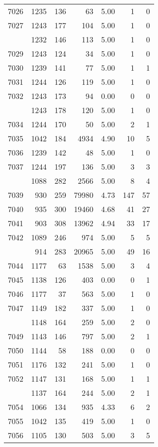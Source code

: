 \documentclass[
]{article}
\begin{document}
\begin{table}
\begin{tabular}[t]{lrrrrrr}
7026 & 1235 & 136 & 63 & 5.00 & 1 & 0\\
7027 & 1243 & 177 & 104 & 5.00 & 1 & 0\\
\addlinespace
7028 & 1232 & 146 & 113 & 5.00 & 1 & 0\\
7029 & 1243 & 124 & 34 & 5.00 & 1 & 0\\
7030 & 1239 & 141 & 77 & 5.00 & 1 & 1\\
7031 & 1244 & 126 & 119 & 5.00 & 1 & 0\\
7032 & 1243 & 173 & 94 & 0.00 & 0 & 0\\
\addlinespace
7033 & 1243 & 178 & 120 & 5.00 & 1 & 0\\
7034 & 1244 & 170 & 50 & 5.00 & 2 & 1\\
7035 & 1042 & 184 & 4934 & 4.90 & 10 & 5\\
7036 & 1239 & 142 & 48 & 5.00 & 1 & 0\\
7037 & 1244 & 197 & 136 & 5.00 & 3 & 3\\
\addlinespace
7038 & 1088 & 282 & 2566 & 5.00 & 8 & 4\\
7039 & 930 & 259 & 79980 & 4.73 & 147 & 57\\
7040 & 935 & 300 & 19460 & 4.68 & 41 & 27\\
7041 & 903 & 308 & 13962 & 4.94 & 33 & 17\\
7042 & 1089 & 246 & 974 & 5.00 & 5 & 5\\
\addlinespace
7043 & 914 & 283 & 20965 & 5.00 & 49 & 16\\
7044 & 1177 & 63 & 1538 & 5.00 & 3 & 4\\
7045 & 1138 & 126 & 403 & 0.00 & 0 & 1\\
7046 & 1177 & 37 & 563 & 5.00 & 1 & 0\\
7047 & 1149 & 182 & 337 & 5.00 & 1 & 0\\
\addlinespace
7048 & 1148 & 164 & 259 & 5.00 & 2 & 0\\
7049 & 1143 & 146 & 797 & 5.00 & 2 & 1\\
7050 & 1144 & 58 & 188 & 0.00 & 0 & 0\\
7051 & 1176 & 132 & 241 & 5.00 & 1 & 0\\
7052 & 1147 & 131 & 168 & 5.00 & 1 & 1\\
\addlinespace
7053 & 1137 & 164 & 244 & 5.00 & 2 & 1\\
7054 & 1066 & 134 & 935 & 4.33 & 6 & 2\\
7055 & 1042 & 135 & 419 & 5.00 & 1 & 0\\
7056 & 1105 & 130 & 503 & 5.00 & 3 & 5\\

\end{tabular}
\end{table}
\end{document}
